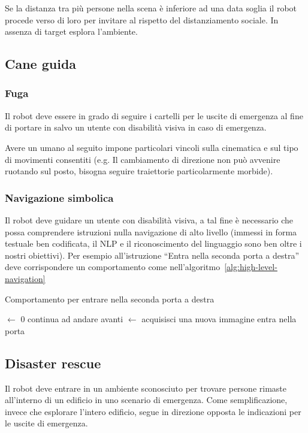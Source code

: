 \documentclass[a4paper]{article}
\begin{document}
	Se la distanza tra più persone nella scena è inferiore ad una data soglia il robot procede verso di loro per invitare al rispetto del distanziamento sociale. In assenza di target esplora l'ambiente.

	\subsection{Cane guida}\label{subsec:Cane-guida}
	\subsubsection{Fuga}\label{subsubsec:Fuga}
	Il robot deve essere in grado di seguire i cartelli per le uscite di emergenza al fine di portare in salvo un utente con disabilità visiva in caso di emergenza.

	Avere un umano al seguito impone particolari vincoli sulla cinematica e sul tipo di movimenti consentiti (e.g. Il cambiamento di direzione non può avvenire ruotando sul posto, bisogna seguire traiettorie particolarmente morbide).
	\subsubsection{Navigazione simbolica}\label{subsubsec:Navigazione-simbolica}
	Il robot deve guidare un utente con disabilità visiva, a tal fine è necessario che possa comprendere istruzioni nulla navigazione di alto livello (immessi in forma testuale ben codificata, il NLP e il riconoscimento del linguaggio sono ben oltre i nostri obiettivi). Per esempio all'istruzione ``Entra nella seconda porta a destra'' deve corrispondere un comportamento come nell'algoritmo~\ref{alg:high-level-navigation}


	\begin{algorithm}[H]
	\caption{Comportamento per entrare nella seconda porta a destra}\label{alg:high-level-navigation}
		\DontPrintSemicolon
		\SetAlgoLined
		\Porte $\gets$ 0\;
		 {
			continua ad andare avanti\;
			\img $\gets$ acquisisci una nuova immagine\;
		}
		entra nella porta\;
	\end{algorithm}

	\subsection{Disaster rescue}\label{subsec:Disaster-rescue}
	Il robot deve entrare in un ambiente sconosciuto per trovare persone rimaste all'interno di un edificio in uno scenario di emergenza. Come semplificazione, invece che esplorare l'intero edificio, segue in direzione opposta le indicazioni per le uscite di emergenza.
\end{document}
